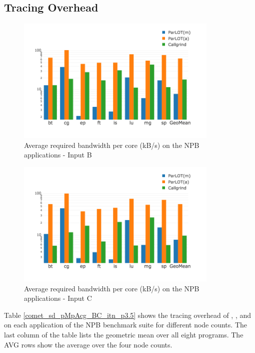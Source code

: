 
\subsection{Tracing Overhead}
\label{subsec:lowtoh}


\begin{figure}[t]
\centering
\includegraphics[width=3.8in]{figs.comet.newMed/comet_chartAvg_bw_B_p3_5.png}
\caption{  Average required bandwidth per core (kB/s) on the NPB applications - Input B}
\label{comet_chartAvg_bw_B_p3_5}
\end{figure}

\begin{figure}[t]
\centering
\includegraphics[width=3.8in]{figs.comet.newMed/comet_chartAvg_bw_C_p3_5.png}
\caption{ Average required bandwidth per core (kB/s) on the NPB applications - Input C}
\label{comet_chartAvg_bw_C_p3_5}
\end{figure}


Table \ref{comet_sd_pMpAcg_BC_itn_p3.5} shows the tracing overhead of \parlotm, \parlota, and \callgrind on each application of the NPB benchmark suite for different node counts. The last column of the table lists the geometric mean over all eight programs. The AVG rows show the average over the four node counts.


